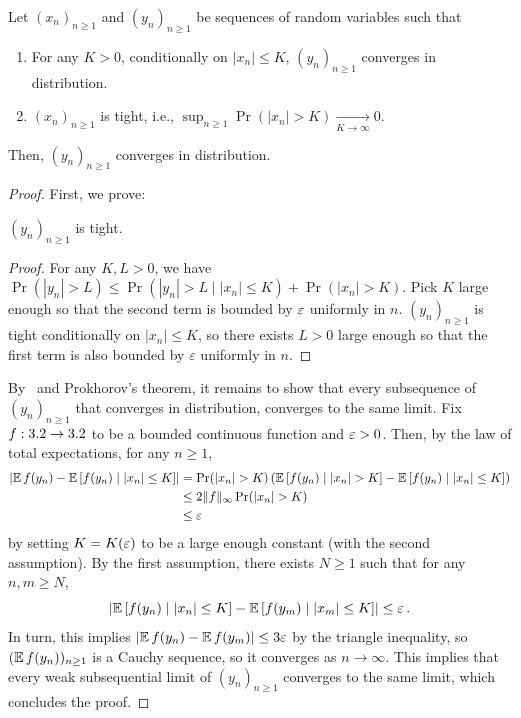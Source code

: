 \begin{lemma}[Truncation]\label{lem:truncation}
    Let $(x_n)_{n\ge 1}$ and $(y_n)_{n\ge 1}$
    be sequences of random variables such that
    \begin{enumerate}
        \item For any $K>0$, conditionally
        on $|x_n|\le K$, $(y_n)_{n\ge 1}$ converges
        in distribution.
        \item $(x_n)_{n\ge 1}$ is tight, i.e., $\sup_{n\ge 1} \Pr(|x_n|>K)\underset{K\to\infty} \longrightarrow 0$.
    \end{enumerate}
    Then, $(y_n)_{n\ge 1}$ converges in distribution.
\end{lemma}

\begin{proof}
    First, we prove:

    \begin{claim}\label{claim:y-tight}
        $(y_n)_{n\ge 1}$ is tight.
    \end{claim} 

    \begin{proof}
        For any $K,L>0$, we have $\Pr(|y_n|>L)\le \Pr(|y_n|>L \mid |x_n|\le K) + \Pr(|x_n|> K)$. Pick $K$ large enough so that the second term is bounded by $\varepsilon$ uniformly in $n$. $(y_n)_{n\ge 1}$ is tight conditionally on $|x_n|\le K$, so there exists $L>0$ large enough so 
        that the first term is also bounded by $\varepsilon$ uniformly in $n$.
    \end{proof}

    \noindent By~ and Prokhorov's
    theorem, it remains to show that
    every subsequence of $(y_n)_{n\ge 1}$ that converges in distribution, converges
    to the same limit.
    Fix $f:3.2\to 3.2$ to be a bounded continuous
    function and $\varepsilon>0$. Then, by the law of total
    expectations, for any $n\ge 1$,
    \begin{align*}
        \left|\E f(y_n) - \E \left[f(y_n) \mid |x_n|\le K\right]\right| &=  \Pr(|x_n|> K)\left(\E \left[f(y_n) \mid |x_n|> K\right] - \E \left[f(y_n) \mid |x_n|\le K\right]\right)\\
        &\le 2 \|f\|_\infty \Pr(|x_n|> K)\\
        &\le \varepsilon
    \end{align*}
    by setting $K = K(\varepsilon)$ to be a large enough constant (with the second assumption). By the first assumption, there exists $N\ge 1$ such that
    for any $n,m\ge N$,
    \[
        \left|\operatorname*{\mathbb{E}} \left[f(y_n) \mid |x_n|\le K\right] - \operatorname*{\mathbb{E}} \left[f(y_m) \mid |x_m|\le K\right]\right|\le \varepsilon\,.
    \]
    In turn, this implies $\left|\operatorname*{\mathbb{E}} f(y_n) - \operatorname*{\mathbb{E}} f(y_m)\right|\le 3\varepsilon$ by the triangle inequality, so $(\operatorname*{\mathbb{E}} f(y_n))_{n\ge 1}$
    is a Cauchy sequence, so it converges
    as $n\to\infty$. This implies
    that every weak subsequential limit of
    $(y_n)_{n\ge 1}$ converges to the same limit,
    which concludes the proof.
\end{proof}


